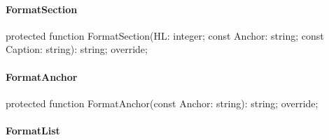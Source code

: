 \documentclass{report}
\newif\ifpdf
\begin{document}
\paragraph*{FormatSection}\hspace*{\fill}

\label{PasDoc_GenPHP.TPHPDocGenerator-FormatSection}
\begin{list}{}{
\setlength{\itemindent}{0cm}
\setlength{\listparindent}{0cm}
\setlength{\leftmargin}{\evensidemargin}
\addtolength{\leftmargin}{\tmplength}
\settowidth{\labelsep}{X}
\addtolength{\leftmargin}{\labelsep}
\setlength{\labelwidth}{\tmplength}
}
\item[\textbf{Declaration}\hfill]
\ifpdf
\begin{flushleft}
\fi
\begin{ttfamily}
protected function FormatSection(HL: integer; const Anchor: string; const Caption: string): string; override;\end{ttfamily}

\ifpdf
\end{flushleft}
\fi

\end{list}
\paragraph*{FormatAnchor}\hspace*{\fill}

\label{PasDoc_GenPHP.TPHPDocGenerator-FormatAnchor}
\begin{list}{}{
\setlength{\itemindent}{0cm}
\setlength{\listparindent}{0cm}
\setlength{\leftmargin}{\evensidemargin}
\addtolength{\leftmargin}{\tmplength}
\settowidth{\labelsep}{X}
\addtolength{\leftmargin}{\labelsep}
\setlength{\labelwidth}{\tmplength}
}
\item[\textbf{Declaration}\hfill]
\ifpdf
\begin{flushleft}
\fi
\begin{ttfamily}
protected function FormatAnchor(const Anchor: string): string; override;\end{ttfamily}

\ifpdf
\end{flushleft}
\fi

\end{list}
\paragraph*{FormatList}\hspace*{\fill}
\end{document}
